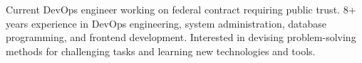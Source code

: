 

\begin{cvparagraph}

Current DevOps engineer working on federal contract requiring public trust.  8+ years experience in DevOps engineering, system administration, database programming, and frontend development. Interested in devising problem-solving methods for challenging tasks and learning new technologies and tools.
\end{cvparagraph}
